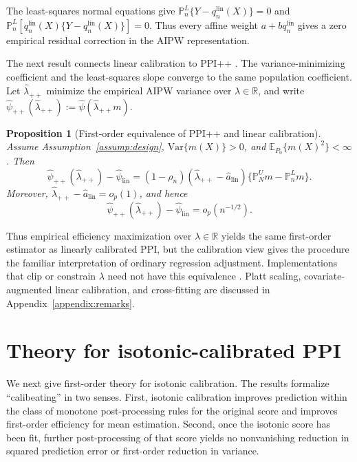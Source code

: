 \documentclass{article}
\theoremstyle{plain}
\newtheorem{proposition}{Proposition}
\theoremstyle{definition}
\newcommand{\E}{\mathbb{E}}
\newcommand{\Var}{\mathrm{Var}}
\newcommand{\1}{\mathbf{1}}
\newcommand{\Pl}{\mathbb{P}^{L}_n}
\newcommand{\Pu}{\mathbb{P}^{U}_N}
\begin{document}
The least-squares normal equations give
\(\Pl\{Y-q_n^{\mathrm{lin}}(X)\}=0\) and
\(\Pl[q_n^{\mathrm{lin}}(X)\{Y-q_n^{\mathrm{lin}}(X)\}]=0\).
Thus every affine weight \(a+bq_n^{\mathrm{lin}}\) gives a zero empirical
residual correction in the AIPW representation.

The next result connects linear calibration to PPI++
\citep{angelopoulos2023ppi}. The variance-minimizing coefficient and the least-squares slope converge
to the same population coefficient. Let \(\hat\lambda_{++}\) minimize the
empirical AIPW variance over \(\lambda\in\mathbb R\), and write
\(\widehat\psi_{++}(\hat\lambda_{++}):=\widehat\psi(\hat\lambda_{++}m)\).

\begin{proposition}[First-order equivalence of PPI++ and linear calibration]
\label{prop:ppi++-linear}
Assume Assumption~\ref{assump:design}, \(\Var\{m(X)\}>0\), and
\(\E_{P_0}\{m(X)^2\}<\infty\). Then
\[
\widehat\psi_{++}(\hat\lambda_{++})-\widehat\psi_{\mathrm{lin}}
=
(1-\rho_n)
(\hat\lambda_{++}-\hat a_{\mathrm{lin}})
\{\Pu m-\Pl m\}.
\]
Moreover, \(\hat\lambda_{++}-\hat a_{\mathrm{lin}}=o_p(1)\), and hence
\[
\widehat\psi_{++}(\hat\lambda_{++})-\widehat\psi_{\mathrm{lin}}
=
o_p(n^{-1/2}).
\]
\end{proposition}

Thus empirical efficiency maximization over
\(\lambda\in\mathbb R\) yields the same first-order estimator as linearly
calibrated PPI, but the calibration view gives the procedure the familiar
interpretation of ordinary regression adjustment. Implementations that clip or
constrain \(\lambda\) need not have this equivalence \citep{angelopoulos2023ppi}. Platt scaling,
covariate-augmented linear calibration, and cross-fitting are discussed in
Appendix~\ref{appendix:remarks}.

\section{Theory for isotonic-calibrated PPI}
\label{sec:theory}

We next give first-order theory for isotonic calibration. The results formalize
``calibeating'' in two senses. First, isotonic calibration improves prediction
within the class of monotone post-processing rules for the original score and
improves first-order efficiency for mean estimation. Second, once the isotonic
score has been fit, further post-processing of that score yields no nonvanishing
reduction in squared prediction error or first-order reduction in variance.
\end{document}
